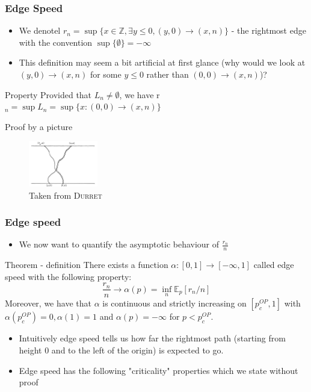 \begin{frame}
	\frametitle{Edge Speed}
	\begin{itemize}
		\item We denotel $r_{n} = \sup \{x \in \mathbb{Z}, \exists y \leq 0, (y, 0) \rightarrow (x, n)\}$ - the rightmost edge with the convention $\sup \{\emptyset\} = - \infty$
		\item This definition may seem a bit artificial at first glance (why would we look at $(y, 0) \rightarrow (x, n)$ for some $y \leq 0$ rather than $(0, 0) \rightarrow (x, n)$)?
	\end{itemize}
	\begin{block}{Property}
		Provided that $L_{n} \neq \emptyset$, we have r$_{n} = \sup L_{n} = \sup \{x: (0, 0) \rightarrow (x, n) \} $
	\end{block}
	\begin{block}{Proof by a picture}
		\begin{figure}
			\caption{Taken from \textsc{Durret}}
			\includegraphics[height = 2cm]{image_edge_speed}
			\centering
		\end{figure}
	\end{block}
\end{frame}

\begin{frame}
	\frametitle{Edge speed}
	\begin{itemize}
		\item We now want to quantify the asymptotic behaviour of $\frac{r_{n}}{n}$
	\end{itemize}
	\begin{block}{Theorem - definition}
		There exists a function $\alpha: [0, 1] \rightarrow [- \infty, 1]$ called edge speed with the following property:
		$$
			\frac{r_{n}}{n} \rightarrow \alpha (p) = \inf_{n} \mathbb{E}_{p}[r_{n}/n]
		$$
		Moreover, we have that $\alpha$ is continuous and strictly increasing on $[p_{c}^{OP}, 1]$ with $\alpha(p_{c}^{OP}) = 0, \alpha(1) = 1$ and $\alpha(p) = -\infty$ for $p < p_{c}^{OP}$.
	\end{block}
	\begin{itemize}
		\item Intuitively edge speed tells us how far the rightmost path (starting from height 0 and to the left of the origin) is expected to go.
		\item Edge speed has the following "criticality" properties which we state without proof
	\end{itemize}

\end{frame}

